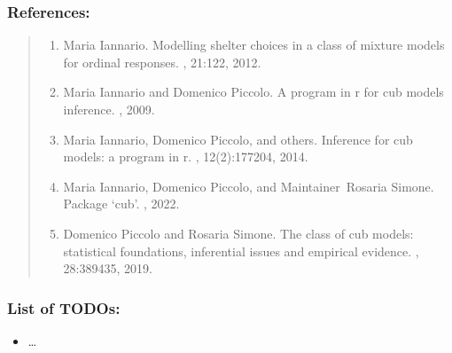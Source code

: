 \documentclass[letterpaper,10pt,english]{sphinxmanual}
\begin{document}
\subsubsection{References:}
\label{\detokenize{cubmods:id378}}\begin{quote}
\begin{enumerate}
%
\setcounter{enumi}{0}
\item {} 
\sphinxAtStartPar
Maria Iannario. Modelling shelter choices in a class of mixture models for ordinal responses. , 21:1\textendash{}22, 2012.

\item {} 
\sphinxAtStartPar
Maria Iannario and Domenico Piccolo. A program in r for cub models inference. , 2009.

\item {} 
\sphinxAtStartPar
Maria Iannario, Domenico Piccolo, and others. Inference for cub models: a program in r. , 12(2):177\textendash{}204, 2014.

\item {} 
\sphinxAtStartPar
Maria Iannario, Domenico Piccolo, and Maintainer Rosaria Simone. Package ‘cub’. , 2022.

\item {} 
\sphinxAtStartPar
Domenico Piccolo and Rosaria Simone. The class of cub models: statistical foundations, inferential issues and empirical evidence. , 28:389\textendash{}435, 2019.

\end{enumerate}
\end{quote}


\subsubsection{List of TODOs:}
\label{\detokenize{cubmods:id416}}\begin{itemize}
\item {} 
\sphinxAtStartPar
…

\end{itemize}
\end{document}
